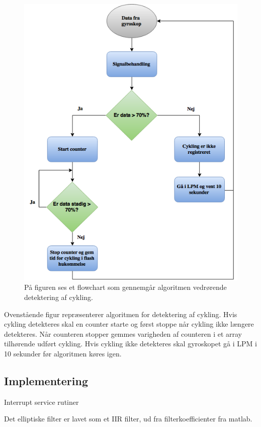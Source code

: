 \begin{figure}[H]
	\centering
	\includegraphics[scale=0.6]{figures/cDesign/algoritme_cykling.png}
	\caption{På figuren ses et flowchart som gennemgår algoritmen vedrørende detektering af cykling.}
	\label{fig:algoritme_cykling}
\end{figure}

Ovenstående figur repræsenterer algoritmen for detektering af cykling. Hvis cykling detekteres skal en counter starte og først stoppe når cykling ikke længere detekteres. Når counteren stopper gemmes varigheden af counteren i et array tilhørende udført cykling. Hvis cykling ikke detekteres skal gyroskopet gå i LPM i 10 sekunder før algoritmen køres igen. 


\subsection{Implementering}
Interrupt service rutiner

Det elliptiske filter er lavet som et IIR filter, ud fra filterkoefficienter fra matlab.




